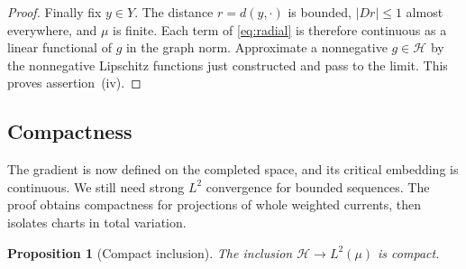 \documentclass[11pt]{article}
\numberwithin{equation}{section}
\newtheorem{proposition}[theorem]{Proposition}
\theoremstyle{definition}
\theoremstyle{remark}
\begin{document}
\begin{proof}
Finally fix $y\in Y$.  The distance $r=d(y,\cdot)$ is bounded,
$|Dr|\le1$ almost everywhere, and $\mu$ is finite.  Each term of
\eqref{eq:radial} is therefore continuous as a linear functional of
$g$ in the graph norm.  Approximate a nonnegative $g\in\mathcal H$ by the
nonnegative Lipschitz functions just constructed and pass to the
limit.  This proves assertion~\textup{(iv)}.
\end{proof}

\subsection{Compactness}

The gradient is now defined on the completed space, and its critical
embedding is continuous. We still need strong $L^2$ convergence for
bounded sequences. The proof obtains compactness for projections of
whole weighted currents, then isolates charts in total variation.

\begin{proposition}[Compact inclusion]
\label{prop:compact-embedding}
The inclusion $\mathcal H\longrightarrow L^2(\mu)$ is compact.
\end{proposition}
\end{document}
